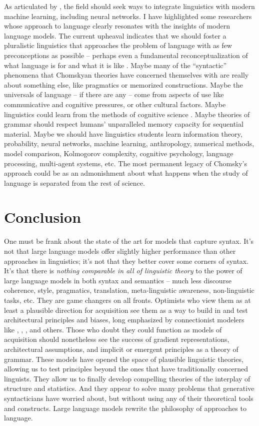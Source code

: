 \documentclass[output=paper,colorlinks,citecolor=brown]{langscibook}
\begin{document}
As articulated by \citet{pater2019generative}, the field should seek ways to integrate linguistics with modern machine learning, including neural networks. I have highlighted some researchers whose approach to language clearly resonates with the insights of modern language models. The current upheaval indicates that we should foster a pluralistic linguistics that approaches the problem of language with as few preconceptions as possible -- perhaps even a fundamental reconceptualization of what language is for and what it is like \citep{edelman2019verbal}. Maybe many of the ``syntactic'' phenomena that Chomskyan theories have concerned themselves with are really about something else, like pragmatics or memorized constructions. Maybe the universals of language -- if there are any -- come from aspects of use like communicative and cognitive pressures, or other cultural factors. Maybe linguistics could learn from the methods of cognitive science \citep{edelman2007bridging}. Maybe theories of grammar should respect humans' unparalleled memory capacity for sequential material. Maybe we should have linguistics students learn information theory, probability, neural networks, machine learning, anthropology, numerical methods, model comparison, Kolmogorov complexity, cognitive psychology, language processing, multi-agent systems, etc. The most permanent legacy of Chomsky's approach could be as an admonishment about what happens when the study of language is separated from the rest of science. 


\section{Conclusion}

One must be frank about the state of the art for models that capture syntax. It's not that large language models offer slightly higher performance than other approaches in linguistics; it's not that they better cover some corners of syntax. It's that there is \textit{nothing comparable in all of linguistic theory} to the power of large language models in both syntax and semantics -- much less discourse coherence, style, pragmatics, translation, meta-linguistic awareness, non-linguistic tasks, etc. They are game changers on all fronts. Optimists who view them as at least a plausible direction for acquisition see them as a way to build in and test architectural principles and biases, long emphasized by connectionist modelers like \citet{mcclelland1986parallel}, \citet{elman1996rethinking}, \citet{smolensky2006harmonic}, and others. Those who doubt they could function as models of acquisition should nonetheless see the success of gradient representations, architectural assumptions, and implicit or emergent principles as a theory of grammar. These models have opened the space of plausible linguistic theories, allowing us to test principles beyond the ones that have traditionally concerned linguists. They allow us to finally develop compelling theories of the interplay of structure and statistics. And they appear to solve many problems that generative syntacticians have worried about, but without using any of their theoretical tools and constructs. Large language models rewrite the philosophy of approaches to language. 
\end{document}
